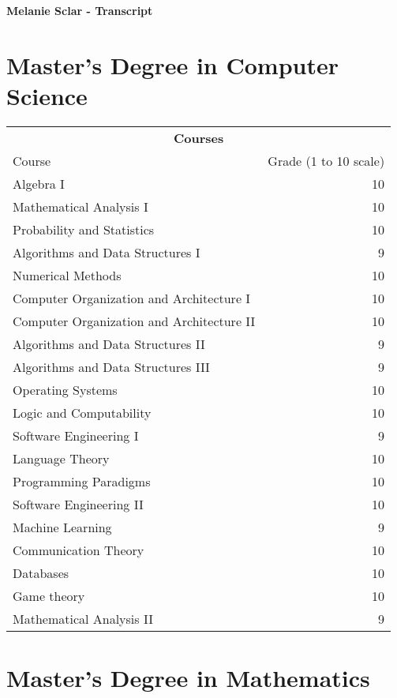 \documentclass [a4paper, 10pt]{article}
\begin{document}
\begin{center}
	{\LARGE \textbf{Melanie Sclar - Transcript}}
\end{center}
\bigskip
\section{Master's Degree in Computer Science}

\begin{table}[!h]
\centering
\begin{tabular}{l r}
\multicolumn{2}{c}{\textbf{Courses}} \\
Course & Grade (1 to 10 scale) \\
\hline
Algebra I & 10 \\
Mathematical Analysis I & 10 \\
Probability and Statistics & 10 \\
Algorithms and Data Structures I & 9 \\
Numerical Methods & 10 \\
Computer Organization and Architecture I & 10 \\
Computer Organization and Architecture II & 10 \\ 
Algorithms and Data Structures II & 9 \\
Algorithms and Data Structures III & 9 \\
Operating Systems & 10 \\ 
Logic and Computability & 10 \\
Software Engineering I & 9 \\
Language Theory & 10 \\
Programming Paradigms & 10 \\
Software Engineering II & 10 \\
Machine Learning & 9 \\
Communication Theory & 10 \\
Databases & 10 \\
Game theory & 10 \\
Mathematical Analysis II & 9 \\

\end{tabular}
\end{table}

\bigskip


\section{Master's Degree in Mathematics}
\end{document}
